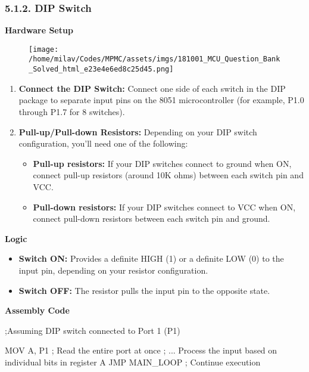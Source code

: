 \documentclass[
]{article}
\newenvironment{Shaded}{}{}
\newcommand{\NormalTok}[1]{#1}
\begin{document}
\hypertarget{512-dip-switch}{%
\subsubsection{5.1.2. DIP Switch}\label{512-dip-switch}}

\textbf{Hardware Setup}

\begin{figure}
\centering
\texttt{[image: /home/milav/Codes/MPMC/assets/imgs/181001\_MCU\_Question\_Bank\_Solved\_html\_e23e4e6ed8c25d45.png]}
\caption{}
\end{figure}

\begin{enumerate}
\def\labelenumi{\arabic{enumi}.}
\item
  \textbf{Connect the DIP Switch:} Connect one side of each switch in
  the DIP package to separate input pins on the 8051 microcontroller
  (for example, P1.0 through P1.7 for 8 switches).
\item
  \textbf{Pull-up/Pull-down Resistors:} Depending on your DIP switch
  configuration, you'll need one of the following:

  \begin{itemize}
  \item
    \textbf{Pull-up resistors:} If your DIP switches connect to ground
    when ON, connect pull-up resistors (around 10K ohms) between each
    switch pin and VCC.
  \item
    \textbf{Pull-down resistors:} If your DIP switches connect to VCC
    when ON, connect pull-down resistors between each switch pin and
    ground.
  \end{itemize}
\end{enumerate}

\textbf{Logic}

\begin{itemize}
\item
  \textbf{Switch ON:} Provides a definite HIGH (1) or a definite LOW (0)
  to the input pin, depending on your resistor configuration.
\item
  \textbf{Switch OFF:} The resistor pulls the input pin to the opposite
  state.
\end{itemize}

\textbf{Assembly Code}

\begin{Shaded}
\begin{Highlighting}[]
\NormalTok{;Assuming DIP switch connected to Port 1 (P1)}

\NormalTok{MOV A, P1       ; Read the entire port at once}
\NormalTok{; ... Process the input based on individual bits in register A}
\NormalTok{JMP MAIN\_LOOP   ; Continue execution}
\end{Highlighting}
\end{Shaded}
\end{document}
